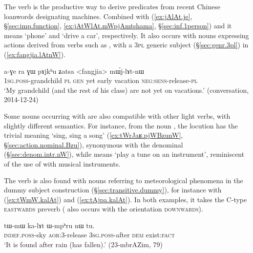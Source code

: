 The verb  is the productive way to derive predicates from recent Chinese loanwords  designating machines. Combined with   (\ref{ex:jAlAt.je}, §\ref{sec:imp.function}, \ref{ex:jAtWlAt.mWpjAmtshama}, §\ref{sec:inf.1person}) and   it means `phone' and `drive a car', respectively. It also occurs with nouns expressing actions derived from verbs such as  , with a \textsc{3pl} generic subject (§\ref{sec:genr.3pl}) in (\ref{ex:fangjia.lAtnW}).

\begin{exe}
\ex \label{ex:fangjia.lAtnW}
\gll a-ɣe ra ɣɯ pɤjkʰu ʑatsa <fangjia> mɯ́j-lɤt-nɯ \\
\textsc{1sg}.\textsc{poss}-grandchild \textsc{pl} \textsc{gen} yet early vacation \textsc{neg}:\textsc{sens}-release-\textsc{pl} \\
\glt `My grandchild (and the rest of his class) are not yet on vacations.' (conversation, 2014-12-24)
\end{exe}

Some nouns occurring with  are also compatible with other light verbs, with slightly different semantics. For instance, from the noun , the locution  has the trivial meaning `sing, sing a song' (\ref{ex:tWrJaʁ.pjWBzunW}, §\ref{sec:action.nominal.Bzu}), synonymous with the denominal   (§\ref{sec:denom.intr.nW}), while  means `play a tune on an instrument', reminiscent of the use of   with musical instruments.
  
 
 The verb   is also found with nouns referring to meteorological phenomena in the dummy subject construction (§\ref{sec:transitive.dummy}), for instance with   (\ref{ex:tWmW.kalAt})  and   (\ref{ex:tAjpa.kalAt}). In both examples, it takes the C-type  \textsc{eastwards} preverb   ( also occurs with the orientation \textsc{downwards}).

\begin{exe}
\ex \label{ex:tWmW.kalAt}
\gll  tɯ-mɯ ka-lɤt ɯ-mpʰru nɯ tu. \\
\textsc{indef}.\textsc{poss}-sky \textsc{aor}:3\flobv{}-release \textsc{3sg}.\textsc{poss}-after \textsc{dem} exist:\textsc{fact} \\
\glt `It is found after rain (has fallen).' (23-mbrAZim, 79)
\end{exe}

